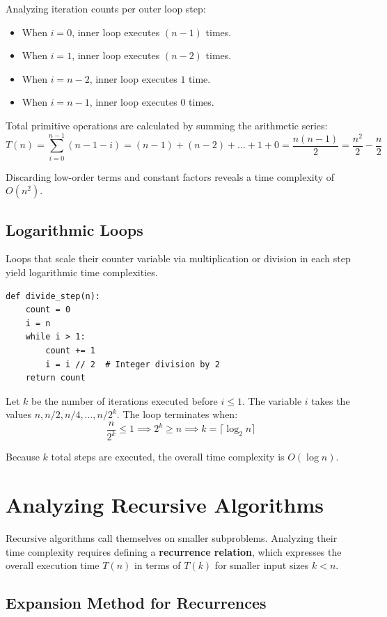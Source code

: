 \documentclass[12pt]{report}
\begin{document}
Analyzing iteration counts per outer loop step:
\begin{itemize}
    \item When $i = 0$, inner loop executes $(n - 1)$ times.
    \item When $i = 1$, inner loop executes $(n - 2)$ times.
    \item When $i = n - 2$, inner loop executes $1$ time.
    \item When $i = n - 1$, inner loop executes $0$ times.
\end{itemize}

Total primitive operations are calculated by summing the arithmetic series:
\[
T(n) = \sum_{i=0}^{n-1} (n - 1 - i) = (n - 1) + (n - 2) + \dots + 1 + 0 = \frac{n(n - 1)}{2} = \frac{n^2}{2} - \frac{n}{2}
\]

Discarding low-order terms and constant factors reveals a time complexity of $O(n^2)$.

\subsection{Logarithmic Loops}

Loops that scale their counter variable via multiplication or division in each step yield logarithmic time complexities.

\begin{verbatim}
def divide_step(n):
    count = 0
    i = n
    while i > 1:
        count += 1
        i = i // 2  # Integer division by 2
    return count
\end{verbatim}

Let $k$ be the number of iterations executed before $i \le 1$. The variable $i$ takes the values $n, n/2, n/4, \dots, n/2^k$. The loop terminates when:
\[
\frac{n}{2^k} \le 1 \implies 2^k \ge n \implies k = \lceil \log_2 n \rceil
\]

Because $k$ total steps are executed, the overall time complexity is $O(\log n)$.

\section{Analyzing Recursive Algorithms}

Recursive algorithms call themselves on smaller subproblems. Analyzing their time complexity requires defining a \textbf{recurrence relation}, which expresses the overall execution time $T(n)$ in terms of $T(k)$ for smaller input sizes $k < n$.

\subsection{Expansion Method for Recurrences}
\end{document}
